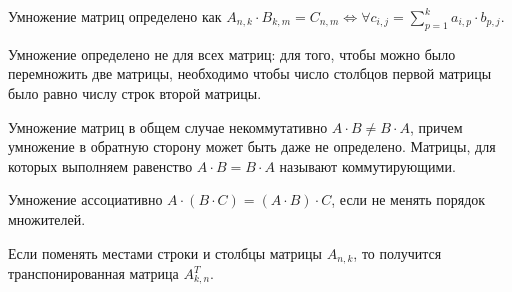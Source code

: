 \begin{remark}
  Умножение матриц определено как \(A_{n, k} \cdot B_{k, m} = C_{n, m} \iff
  \forall c_{i, j} = \sum_{p = 1}^k a_{i, p} \cdot b_{p, j}\).
  
  Умножение определено не для всех матриц: для того, чтобы можно было
  перемножить две матрицы, необходимо чтобы число столбцов первой матрицы было
  равно числу строк второй матрицы.
\end{remark}

\begin{remark}
  Умножение матриц в общем случае некоммутативно \(A \cdot B \ne B \cdot A\),
  причем умножение в обратную сторону может быть даже не определено. Матрицы,
  для которых выполняем равенство \(A \cdot B = B \cdot A\) называют
  коммутирующими.
\end{remark}

\begin{remark}
  Умножение ассоциативно \(A \cdot (B \cdot C) = (A \cdot B) \cdot C\), если не
  менять порядок множителей.
\end{remark}

\begin{definition}
  Если поменять местами строки и столбцы матрицы \(A_{n, k}\), то получится
  транспонированная матрица \(A_{k, n}^T\).
\end{definition}


